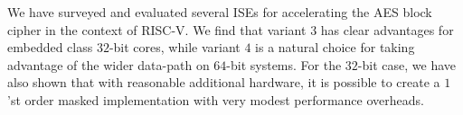 
We have surveyed and evaluated several ISEs for accelerating
the AES block cipher in the context of RISC-V.
We find that variant $3$ has clear advantages for embedded class
$32$-bit cores, while variant $4$ is a natural choice for taking
advantage of the wider data-path on $64$-bit systems.
For the $32$-bit case, we have also shown that with reasonable additional
hardware, it is possible to create a $1$'st order masked implementation with
very modest performance overheads.

